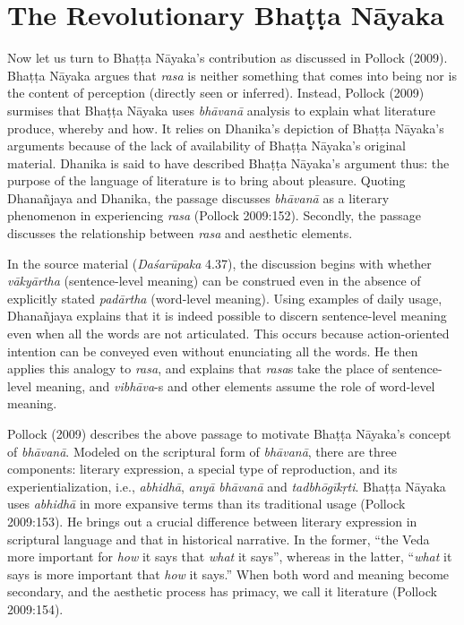 \section*{The Revolutionary Bhaṭṭa Nāyaka}

Now let us turn to Bhaṭṭa Nāyaka’s contribution as discussed in Pollock (2009). Bhaṭṭa Nāyaka argues that \textsl{rasa} is neither something that comes into being nor is the content of perception (directly seen or inferred). Instead, Pollock (2009) surmises that Bhaṭṭa Nāyaka uses \textsl{bhāvanā} analysis to explain what literature produce, whereby and how. It relies on Dhanika’s depiction of Bhaṭṭa Nāyaka’s arguments because of the lack of availability of Bhaṭṭa Nāyaka’s original material. Dhanika is said to have described Bhaṭṭa Nāyaka’s argument thus: the purpose of the language of literature is to bring about pleasure. Quoting Dhanañjaya and Dhanika, the passage discusses \textsl{bhāvanā} as a literary phenomenon in experiencing \textsl{rasa} (Pollock 2009:152). Secondly, the passage discusses the relationship between \textsl{rasa} and aesthetic elements.

In the source material (\textsl{Daśarūpaka} 4.37), the discussion begins with whether \textsl{vākyārtha} (sentence-level meaning) can be construed even in the absence of explicitly stated \textsl{padārtha} (word-level meaning). Using examples of daily usage, Dhanañjaya explains that it is indeed possible to discern sentence-level meaning even when all the words are not articulated. This occurs because action-oriented intention can be conveyed even without enunciating all the words. He then applies this analogy to \textsl{rasa}, and explains that \textsl{rasa}s take the place of sentence-level meaning, and \textsl{vibhāva}-s and other elements assume the role of word-level meaning.     

Pollock (2009) describes the above passage to motivate Bhaṭṭa Nāyaka’s concept of \textsl{bhāvanā}. Modeled on the scriptural form of \textsl{bhāvanā}, there are three components: literary expression, a special type of reproduction, and its experientialization, i.e., \textsl{abhidhā}, \textsl{anyā} \textsl{bhāvanā} and \textsl{tadbhōgīkṛti}. Bhaṭṭa Nāyaka uses \textsl{abhidhā} in more expansive terms than its traditional usage (Pollock 2009:153). He brings out a crucial difference between literary expression in scriptural language and that in historical narrative. In the former, “the Veda more important for \textsl{how }it says that \textsl{what }it says”, whereas in the latter, “\textsl{what} it says is more important that \textsl{how }it says.” When both word and meaning become secondary, and the aesthetic process has primacy, we call it literature (Pollock 2009:154).

